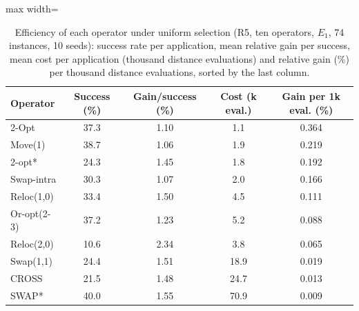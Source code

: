 \begin{table}[t]
\caption{Efficiency of each operator under uniform selection (R5, ten operators, $E_1$, 74 instances, 10 seeds): success rate per application, mean relative gain per success, mean cost per application (thousand distance evaluations) and relative gain (\%) per thousand distance evaluations, sorted by the last column.}\label{tab:eff}
\centering
\small
\begin{adjustbox}{max width=\linewidth}
\begin{tabular}{lcccc}
\toprule
Operator & Success (\%) & Gain/success (\%) & Cost (k eval.) & Gain per 1k eval. (\%) \\
\midrule
2-Opt & 37.3 & 1.10 & 1.1 & 0.364 \\
Move(1) & 38.7 & 1.06 & 1.9 & 0.219 \\
2-opt* & 24.3 & 1.45 & 1.8 & 0.192 \\
Swap-intra & 30.3 & 1.07 & 2.0 & 0.166 \\
Reloc(1,0) & 33.4 & 1.50 & 4.5 & 0.111 \\
Or-opt(2-3) & 37.2 & 1.23 & 5.2 & 0.088 \\
Reloc(2,0) & 10.6 & 2.34 & 3.8 & 0.065 \\
Swap(1,1) & 24.4 & 1.51 & 18.9 & 0.019 \\
CROSS & 21.5 & 1.48 & 24.7 & 0.013 \\
SWAP* & 40.0 & 1.55 & 70.9 & 0.009 \\
\bottomrule
\end{tabular}
\end{adjustbox}
\end{table}
